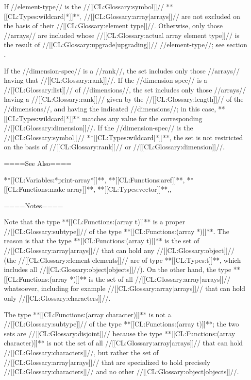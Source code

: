 If //element-type// is the //[[CL:Glossary:symbol]]// **[[CL:Types:wildcard|*]]**, //[[CL:Glossary:array|arrays]]// are not excluded on the basis of their //[[CL:Glossary:element type]]//. Otherwise, only those //arrays// are included whose //[[CL:Glossary:actual array element type]]// is the result of //[[CL:Glossary:upgrade|upgrading]]// //element-type//; see section {\secref\ArrayUpgrading}.

If the //dimension-spec// is a //rank//, the set includes only those //arrays// having that //[[CL:Glossary:rank]]//. If the //dimension-spec// is a //[[CL:Glossary:list]]// of //dimensions//, the set includes only those //arrays// having a //[[CL:Glossary:rank]]// given by the //[[CL:Glossary:length]]// of the //dimensions//, and having the indicated //dimensions//; in this case, **[[CL:Types:wildcard|*]]** matches any value for the corresponding //[[CL:Glossary:dimension]]//. If the //dimension-spec// is the //[[CL:Glossary:symbol]]// **[[CL:Types:wildcard|*]]**, the set is not restricted on the basis of //[[CL:Glossary:rank]]// or //[[CL:Glossary:dimension]]//.

====See Also====

**[[CL:Variables:*print-array*]]**, **[[CL:Functions:aref]]**, **[[CL:Functions:make-array]]**, **[[CL:Types:vector]]**,{\secref\SharpsignA}, {\secref\PrintingOtherArrays}

====Notes====

Note that the type **[[CL:Functions:(array t)]]** is a proper //[[CL:Glossary:subtype]]// of the type **[[CL:Functions:(array *)]]**. The reason is that the type **[[CL:Functions:(array t)]]** is the set of //[[CL:Glossary:array|arrays]]// that can hold any //[[CL:Glossary:object]]// (the //[[CL:Glossary:element|elements]]// are of type **[[CL:Types:t]]**, which includes all //[[CL:Glossary:object|objects]]//). On the other hand, the type **[[CL:Functions:(array *)]]** is the set of all //[[CL:Glossary:array|arrays]]// whatsoever, including for example //[[CL:Glossary:array|arrays]]// that can hold only //[[CL:Glossary:characters]]//.

The type **[[CL:Functions:(array character)]]** is not a //[[CL:Glossary:subtype]]// of the type **[[CL:Functions:(array t)]]**; the two sets are //[[CL:Glossary:disjoint]]// because the type **[[CL:Functions:(array character)]]** is not the set of all //[[CL:Glossary:array|arrays]]// that can hold //[[CL:Glossary:characters]]//, but rather the set of //[[CL:Glossary:array|arrays]]// that are specialized to hold precisely //[[CL:Glossary:characters]]// and no other //[[CL:Glossary:object|objects]]//.

 
